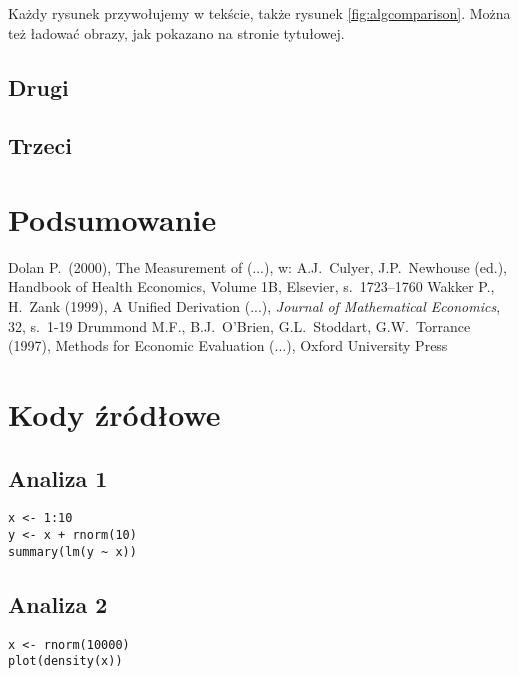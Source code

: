 \documentclass[12pt,a4paper,twoside,openany]{book}
\begin{document}
Każdy rysunek przywołujemy w tekście, także rysunek \ref{fig:algcomparison}. Można też ładować obrazy, jak pokazano na stronie tytułowej.

\section{Drugi}

\section{Trzeci}

\clearpage

\chapter{Podsumowanie}

\clearpage
{}
\begin{thebibliography}{99}
\setlength{\itemsep}{0pt}%
 Dolan P.~(2000), The Measurement of (...), w: A.J.~Culyer, J.P.~Newhouse (ed.), Handbook of Health Economics, Volume 1B, Elsevier, s.~1723--1760
 Wakker P., H.~Zank (1999), A Unified Derivation (...), \textit{Journal of  Mathematical Economics}, 32, s.~1-19
 Drummond M.F., B.J.~O'Brien, G.L.~Stoddart, G.W.~Torrance (1997), Methods for Economic Evaluation (...), Oxford University Press
\end{thebibliography}

\clearpage
{}
\listoffigures

\clearpage
\listoftables
{}

\appendix
\chapter*{Kody źródłowe}

\section*{Analiza 1}
\begin{verbatim}
x <- 1:10
y <- x + rnorm(10)
summary(lm(y ~ x))
\end{verbatim}

\section*{Analiza 2}
\begin{verbatim}
x <- rnorm(10000)
plot(density(x))
\end{verbatim}
\end{document}
